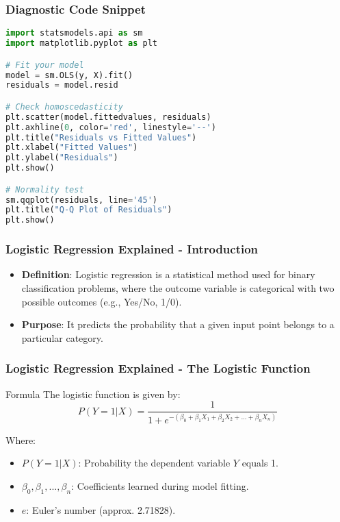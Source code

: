 \documentclass[aspectratio=169]{beamer}
\begin{document}
\begin{frame}[fragile]
    \frametitle{Diagnostic Code Snippet}
    \begin{lstlisting}[language=Python]
import statsmodels.api as sm
import matplotlib.pyplot as plt

# Fit your model
model = sm.OLS(y, X).fit()
residuals = model.resid

# Check homoscedasticity
plt.scatter(model.fittedvalues, residuals)
plt.axhline(0, color='red', linestyle='--')
plt.title("Residuals vs Fitted Values")
plt.xlabel("Fitted Values")
plt.ylabel("Residuals")
plt.show()

# Normality test
sm.qqplot(residuals, line='45')
plt.title("Q-Q Plot of Residuals")
plt.show()
    \end{lstlisting}
\end{frame}

\begin{frame}[fragile]
    \frametitle{Logistic Regression Explained - Introduction}
    \begin{itemize}
        \item \textbf{Definition}: Logistic regression is a statistical method used for binary classification problems, where the outcome variable is categorical with two possible outcomes (e.g., Yes/No, 1/0).
        \item \textbf{Purpose}: It predicts the probability that a given input point belongs to a particular category.
    \end{itemize}
\end{frame}

\begin{frame}[fragile]
    \frametitle{Logistic Regression Explained - The Logistic Function}
    \begin{block}{Formula}
        The logistic function is given by:
        \begin{equation}
            P(Y=1 | X) = \frac{1}{1 + e^{-(\beta_0 + \beta_1X_1 + \beta_2X_2 + ... + \beta_nX_n)}}
        \end{equation}
    \end{block}
    Where:
    \begin{itemize}
        \item \( P(Y=1 | X) \): Probability the dependent variable \( Y \) equals 1.
        \item \( \beta_0, \beta_1, ... , \beta_n \): Coefficients learned during model fitting.
        \item \( e \): Euler's number (approx. 2.71828).
    \end{itemize}
\end{frame}
\end{document}
